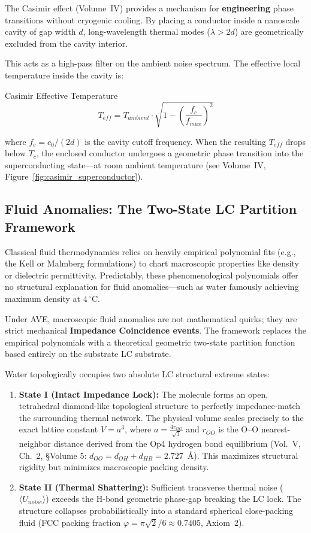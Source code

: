 The Casimir effect (Volume~IV) provides a mechanism for \textbf{engineering} phase transitions without cryogenic cooling. By placing a conductor inside a nanoscale cavity of gap width $d$, long-wavelength thermal modes ($\lambda > 2d$) are geometrically excluded from the cavity interior.

This acts as a high-pass filter on the ambient noise spectrum. The effective local temperature inside the cavity is:
\begin{resultbox}{Casimir Effective Temperature}
\begin{equation}
    T_{eff} = T_{ambient} \cdot \sqrt{1 - \left(\frac{f_c}{f_{max}}\right)^2}
    \label{eq:casimir_temperature}
\end{equation}
\end{resultbox}
where $f_c = c_0 / (2d)$ is the cavity cutoff frequency. When the resulting $T_{eff}$ drops below $T_c$, the enclosed conductor undergoes a geometric phase transition into the superconducting state---at room ambient temperature (see Volume~IV, Figure~\ref{fig:casimir_superconductor}).

\subsection{Fluid Anomalies: The Two-State LC Partition Framework}
\label{sec:water_partition}

Classical fluid thermodynamics relies on heavily empirical polynomial fits (e.g., the Kell or Malmberg formulations) to chart macroscopic properties like density or dielectric permittivity. Predictably, these phenomenological polynomials offer no structural explanation for fluid anomalies—such as water famously achieving maximum density at $4\,^{\circ}\text{C}$.

Under AVE, macroscopic fluid anomalies are not mathematical quirks; they are strict mechanical \textbf{Impedance Coincidence events}. The framework replaces the empirical polynomials with a theoretical geometric two-state partition function based entirely on the substrate LC substrate.

Water topologically occupies two absolute LC structural extreme states:
\begin{enumerate}
    \item \textbf{State I (Intact Impedance Lock):} The molecule forms an open, tetrahedral diamond-like topological structure to perfectly impedance-match the surrounding thermal network. The physical volume scales precisely to the exact lattice constant $V = a^3$, where $a = \frac{4 r_{OO}}{\sqrt{3}}$ and $r_{OO}$ is the O--O nearest-neighbor distance derived from the Op4 hydrogen bond equilibrium (Vol.~V, Ch.~2, \S Volume 5: $d_{OO} = d_{OH} + d_{HB} = 2.727$~\AA). This maximizes structural rigidity but minimizes macroscopic packing density.
    \item \textbf{State II (Thermal Shattering):} Sufficient transverse thermal noise ($\langle U_{noise} \rangle$) exceeds the H-bond geometric phase-gap breaking the LC lock. The structure collapses probabilistically into a standard spherical close-packing fluid (FCC packing fraction $\varphi = \pi\sqrt{2}/6 \approx 0.7405$, Axiom~2).
\end{enumerate}

